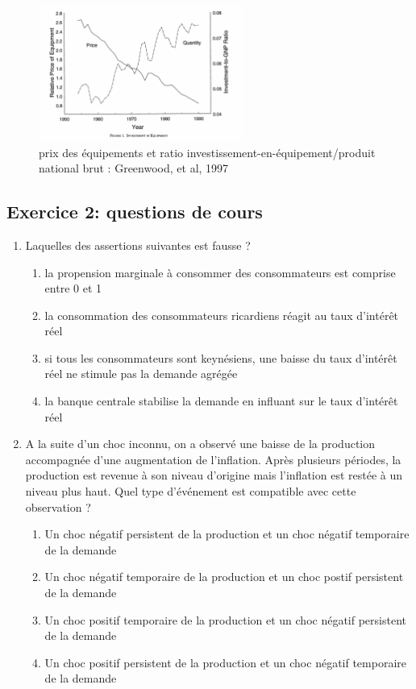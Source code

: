 \documentclass{article}
\providecommand{\tightlist}{%
  \setlength{\itemsep}{0pt}\setlength{\parskip}{0pt}}
\begin{document}
\begin{enumerate}
\begin{figure}
  \centering
  \includegraphics[width=0.6\textwidth]{pi.png}
  \caption{ prix des équipements et ratio investissement-en-équipement/produit national brut : Greenwood, et al, 1997}
  \label{fig:example}
\end{figure}
\newpage 


\hypertarget{mcq}{\subsection{Exercice 2: questions de cours}\label{mcq}}


\begin{enumerate}
    \tightlist

\item Laquelles des assertions suivantes est fausse ?

\begin{enumerate}
\tightlist
\item
  la propension marginale à consommer des consommateurs est comprise
  entre 0 et 1
\item
  la consommation des consommateurs ricardiens réagit au taux d'intérêt
  réel
\item
  si tous les consommateurs sont keynésiens, une baisse du taux
  d'intérêt réel ne stimule pas la demande agrégée
\item
  la banque centrale stabilise la demande en influant sur le taux
  d'intérêt réel
\end{enumerate}

\item A la suite d'un choc inconnu, on a observé une baisse de la
production accompagnée d'une augmentation de l'inflation. Après
plusieurs périodes, la production est revenue à son niveau d'origine
mais l'inflation est restée à un niveau plus haut. Quel type d'événement
est compatible avec cette observation ?

\begin{enumerate}
\tightlist
\item
  Un choc négatif persistent de la production et un choc négatif
  temporaire de la demande
\item
  Un choc négatif temporaire de la production et un choc postif
  persistent de la demande
\item
  Un choc positif temporaire de la production et un choc négatif
  persistent de la demande
\item
  Un choc positif persistent de la production et un choc négatif
  temporaire de la demande
\end{enumerate}


\end{enumerate}
\end{enumerate}
\end{document}
